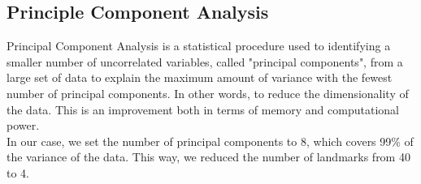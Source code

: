 \documentclass[a4paper]{article}
\begin{document}
\subsection{Principle Component Analysis}

Principal Component Analysis is a statistical procedure  used to identifying a smaller number of uncorrelated variables, called "principal components", from a large set of data to explain the maximum amount of variance with the fewest number of principal components. In other words, to reduce the dimensionality of the data. This is an improvement both in terms of memory and computational power.\\
In our case, we set the number of principal components to 8, which covers 99\% of the variance of the data. This way, we reduced the number of landmarks from 40 to 4.
\end{document}
